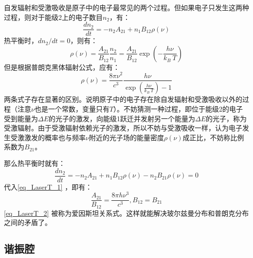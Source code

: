 自发辐射和受激吸收是原子中的电子最常见的两个过程。但如果电子只发生这两种过程，则对于能级2上的电子数目$n_2$，有：
\begin{equation}
\frac{dn_2}{dt}=-n_2A_{21}+n_1B_{12}\rho(\nu)
\end{equation}
热平衡时，$dn_2/dt=0$，则有：
\begin{equation}
\rho(\nu)=\frac{A_{21}}{B_{12}}\frac{n_2}{n_1}=\frac{A_{21}}{B_{12}}\exp(-\frac{h\nu}{k_B \ T})
\end{equation}
但是根据普朗克黑体辐射公式，应有：
\begin{equation}\label{eq_LaserT_1}
\rho(\nu)=\frac{8\pi\nu^2}{c^3}\frac{h\nu}{\exp(\frac{h\nu}{k_B\ T})-1}
\end{equation}
两条式子存在显著的区别。说明原子中的电子存在除自发辐射和受激吸收以外的过程（注意$\nu$也是一个常数，变量只有$T$）。不妨猜测一种过程，即位于能级2的电子受到能量为$\Delta E$的光子的激发，向能级1跃迁并发射另一个能量为$\Delta E$的光子，称为受激辐射。由于受激辐射依赖光子的激发，所以不妨与受激吸收一样，认为电子发生受激激发的概率也与频率$\nu$附近的光子场的能量密度$\rho(\nu)$成正比，不妨称比例系数为$B_{21}$。

那么热平衡时就有：
\begin{equation}
\frac{dn_2}{dt}=-n_2A_{21}+n_1B_{12}\rho(\nu)-n_2B_{21}\rho(\nu)=0
\end{equation}
代入\autoref{eq_LaserT_1} ，即有：
\begin{equation}\label{eq_LaserT_2}
\frac{A_{21}}{B_{12}}=\frac{8\pi h\nu^3}{c^3},B_{12}=B_{21}
\end{equation}
\autoref{eq_LaserT_2} 被称为爱因斯坦关系式。这样就能解决玻尔兹曼分布和普朗克分布之间的矛盾了。
\subsection{谐振腔}
